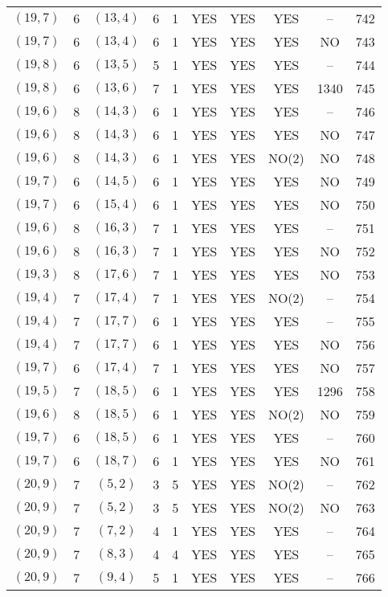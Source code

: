 \begin{longtable}{|c|c|c|c|c|c|c|c|c|c|}
$(19, 7)$ & 6 & $(13, 4)$ & 6 & 1 & YES & YES & YES & -- & 742\\
$(19, 7)$ & 6 & $(13, 4)$ & 6 & 1 & YES & YES & YES & NO & 743\\
$(19, 8)$ & 6 & $(13, 5)$ & 5 & 1 & YES & YES & YES & -- & 744\\
$(19, 8)$ & 6 & $(13, 6)$ & 7 & 1 & YES & YES & YES & 1340 & 745\\
$(19, 6)$ & 8 & $(14, 3)$ & 6 & 1 & YES & YES & YES & -- & 746\\
$(19, 6)$ & 8 & $(14, 3)$ & 6 & 1 & YES & YES & YES & NO & 747\\
$(19, 6)$ & 8 & $(14, 3)$ & 6 & 1 & YES & YES & NO(2) & NO & 748\\
$(19, 7)$ & 6 & $(14, 5)$ & 6 & 1 & YES & YES & YES & NO & 749\\
$(19, 7)$ & 6 & $(15, 4)$ & 6 & 1 & YES & YES & YES & NO & 750\\
$(19, 6)$ & 8 & $(16, 3)$ & 7 & 1 & YES & YES & YES & -- & 751\\
$(19, 6)$ & 8 & $(16, 3)$ & 7 & 1 & YES & YES & YES & NO & 752\\
$(19, 3)$ & 8 & $(17, 6)$ & 7 & 1 & YES & YES & YES & NO & 753\\
$(19, 4)$ & 7 & $(17, 4)$ & 7 & 1 & YES & YES & NO(2) & -- & 754\\
$(19, 4)$ & 7 & $(17, 7)$ & 6 & 1 & YES & YES & YES & -- & 755\\
$(19, 4)$ & 7 & $(17, 7)$ & 6 & 1 & YES & YES & YES & NO & 756\\
$(19, 7)$ & 6 & $(17, 4)$ & 7 & 1 & YES & YES & YES & NO & 757\\
$(19, 5)$ & 7 & $(18, 5)$ & 6 & 1 & YES & YES & YES & 1296 & 758\\
$(19, 6)$ & 8 & $(18, 5)$ & 6 & 1 & YES & YES & NO(2) & NO & 759\\
$(19, 7)$ & 6 & $(18, 5)$ & 6 & 1 & YES & YES & YES & -- & 760\\
$(19, 7)$ & 6 & $(18, 7)$ & 6 & 1 & YES & YES & YES & NO & 761\\
$(20, 9)$ & 7 & $(5, 2)$ & 3 & 5 & YES & YES & NO(2) & -- & 762\\
$(20, 9)$ & 7 & $(5, 2)$ & 3 & 5 & YES & YES & NO(2) & NO & 763\\
$(20, 9)$ & 7 & $(7, 2)$ & 4 & 1 & YES & YES & YES & -- & 764\\
$(20, 9)$ & 7 & $(8, 3)$ & 4 & 4 & YES & YES & YES & -- & 765\\
$(20, 9)$ & 7 & $(9, 4)$ & 5 & 1 & YES & YES & YES & -- & 766\\

\end{longtable}
